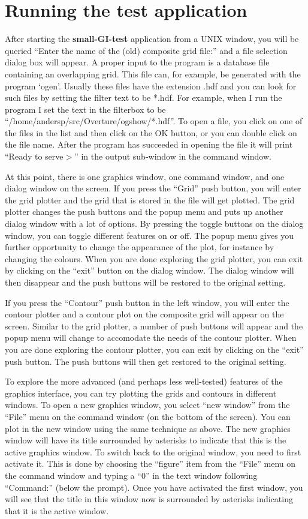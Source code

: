 \documentclass{article}
\begin{document}
\section{Running the test application}
After starting the {\bf small-GI-test} application from a UNIX window, you will be queried
``Enter the name of the (old) composite grid file:'' and a file
selection dialog box will appear. A proper input to the program is a
database file containing an overlapping grid. This file can, for
example, be generated with the program `ogen'. Usually these files
have the extension .hdf and you can look for such files by setting the
filter text to be *.hdf. For example, when I run the program I
set the text in the filterbox to be
``/home/andersp/src/Overture/ogshow/*.hdf''. To open a file, you click
on one of the files in the list and then click on the OK button, or
you can double click on the file name. After the program has succeeded
in opening the file it will print ``Ready to serve$>$'' in the output
sub-window in the command window. 

At this point, there is one graphics window, one command window, and one dialog
window on the screen. If you press the ``Grid''
push button, you will enter the grid plotter and the grid that is stored in the file will
get plotted. The grid plotter changes the push buttons and the popup menu and puts up
another dialog window with a lot of options.  By pressing the toggle buttons on the dialog
window, you can toggle different features on or off. The popup menu gives you further
opportunity to change the appearance of the plot, for instance by changing the
colours. When you are done exploring the grid plotter, you can exit by clicking on the
``exit'' button on the dialog window. The dialog window will then disappear and the push
buttons will be restored to the original setting.

If you press the ``Contour'' push button in the left window, you will enter the contour
plotter and a contour plot on the composite grid will appear on the screen. Similar to the
grid plotter, a number of push buttons will appear and the popup menu will change to
accomodate the needs of the contour plotter. When you are done exploring the contour
plotter, you can exit by clicking on the ``exit'' push button. The push buttons will then
get restored to the original setting.

To explore the more advanced (and perhaps less well-tested) features of the graphics
interface, you can try plotting the grids and contours in different windows. To open a new
graphics window, you select ``new window'' from the ``File'' menu on the command window
(on the bottom of the screen). You can plot in the new window using the same technique as
above. The new graphics window will have its title surrounded by asterisks to indicate
that this is the active graphics window. To switch back to the original window, you need
to first activate it. This is done by choosing the ``figure'' item from the ``File'' menu
on the command window and typing a ``0'' in the text window following ``Command:'' (below
the prompt). Once you have activated the first window, you will see that the title in this
window now is surrounded by asterisks indicating that it is the active window.
\end{document}
